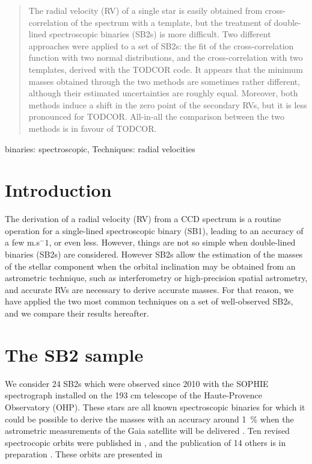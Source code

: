 \documentclass{sf2a-conf2017}
\begin{document}

\begin{abstract}
The radial velocity (RV) of a single star is easily obtained from cross-correlation of the spectrum with a template, but the treatment of double-lined spectroscopic binaries (SB2s) is more difficult. Two different approaches were applied to a set of SB2s: the fit of the cross-correlation function with two normal distributions, and the cross-correlation with two templates, derived with the TODCOR code. It appears that the minimum masses obtained through the two methods are sometimes rather different, although their estimated uncertainties are roughly equal. Moreover, both methods induce a shift in the zero point of the secondary RVs, but it is less pronounced for TODCOR. All-in-all the comparison between the two methods is in favour of TODCOR.
\end{abstract}


\begin{keywords}
binaries: spectroscopic, Techniques: radial velocities
\end{keywords}



\section{Introduction}
The derivation of a radial velocity (RV) from a CCD spectrum is a routine operation for a single-lined spectroscopic binary (SB1),
leading to an accuracy of a few m.s$^-1$, or even less. However, things are not so simple when double-lined binaries (SB2s)
are considered. However SB2s allow the estimation of the masses of the stellar component when the orbital inclination may be obtained
from an astrometric technique, such as interferometry or high-precision spatial astrometry, and accurate RVs are necessary
to derive accurate masses. For that reason, we have applied the two most common techniques on a set of well-observed SB2s,
and we compare their results hereafter.

\section{The SB2 sample}
We consider 24 SB2s which were observed since 2010 with the SOPHIE spectrograph installed on the 193 cm telescope of the
Haute-Provence Observatory (OHP). These stars are all known spectroscopic binaries for which it could be possible to 
derive the masses with an accuracy around 1~\% when the astrometric measurements of the Gaia satellite will be delivered
\citep{paper1}. Ten revised spectrocopic orbits were published in \cite{paper3}, and the publication of 14 others is in
preparation \citep{paper4}. These orbits are presented in \cite{sf2a17b}
\end{document}
